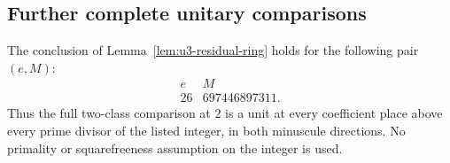 \subsection{Further complete unitary comparisons}
\label{sec:u3-minus7-higher4}

\begin{proposition}
\label{prop:u3-minus7-higher4}
The conclusion of Lemma~\ref{lem:u3-residual-ring} holds for
the following pair $(e,M)$:
\[
 \begin{array}{c|l}
 e&M\\ \hline
 26&697446897311.
 \end{array}
 \tag{U4.1}
\]
Thus the full two-class comparison at $2$ is a unit at every
coefficient place above every prime divisor of the listed integer,
in both minuscule directions. No primality or squarefreeness
assumption on the integer is used.
\end{proposition}

